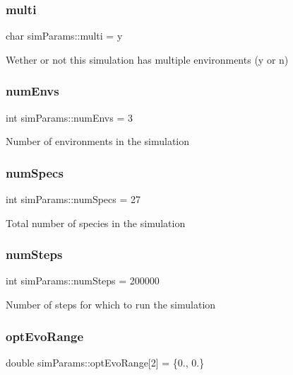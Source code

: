 \subsubsection{\texorpdfstring{multi}{multi}}
{\footnotesize\ttfamily char sim\+Params\+::multi = \textquotesingle{}y\textquotesingle{}}

Wether or not this simulation has multiple environments (\textquotesingle{}y\textquotesingle{} or \textquotesingle{}n\textquotesingle{}) \mbox{\label{structsimParams_a5d284deecb9cbd1b2680670822cae29a}} 
\subsubsection{\texorpdfstring{num\+Envs}{numEnvs}}
{\footnotesize\ttfamily int sim\+Params\+::num\+Envs = 3}

Number of environments in the simulation \mbox{\label{structsimParams_a83b3c9f8e5dee0b7b4e63a17dc2646bd}} 
\subsubsection{\texorpdfstring{num\+Specs}{numSpecs}}
{\footnotesize\ttfamily int sim\+Params\+::num\+Specs = 27}

Total number of species in the simulation \mbox{\label{structsimParams_a027234312109ab21e3f8dacda4039c9f}} 
\subsubsection{\texorpdfstring{num\+Steps}{numSteps}}
{\footnotesize\ttfamily int sim\+Params\+::num\+Steps = 200000}

Number of steps for which to run the simulation \mbox{\label{structsimParams_a2822e99362ed71f123e812a8fd9ad443}} 
\subsubsection{\texorpdfstring{opt\+Evo\+Range}{optEvoRange}}
{\footnotesize\ttfamily double sim\+Params\+::opt\+Evo\+Range\mbox{[}2\mbox{]} = \{0., 0.\}}

